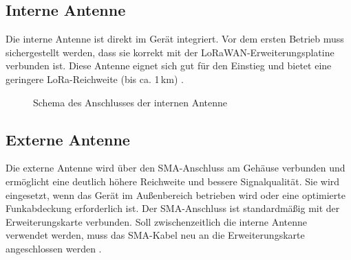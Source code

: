 \subsection{Interne Antenne}
	Die interne Antenne ist direkt im Gerät integriert. Vor dem ersten Betrieb muss sichergestellt werden, dass sie korrekt mit der LoRaWAN-Erweiterungsplatine verbunden ist. Diese Antenne eignet sich gut für den Einstieg und bietet eine geringere LoRa-Reichweite (bis ca. 1\,km) \cite{mikrotik:2025}.
	\begin{figure}[H]
		\centering
		\caption{Schema des Anschlusses der internen Antenne}
	\end{figure}

\subsection{Externe Antenne}
	Die externe Antenne wird über den SMA-Anschluss am Gehäuse verbunden und ermöglicht eine deutlich höhere Reichweite und bessere Signalqualität. Sie wird eingesetzt, wenn das Gerät im Au{\ss}enbereich betrieben wird oder eine optimierte Funkabdeckung erforderlich ist. Der SMA-Anschluss ist standardmä{\ss}ig mit der Erweiterungskarte verbunden. Soll zwischenzeitlich die interne Antenne verwendet werden, muss das SMA-Kabel neu an die Erweiterungskarte angeschlossen werden \cite{mikrotik:2020}.
	
